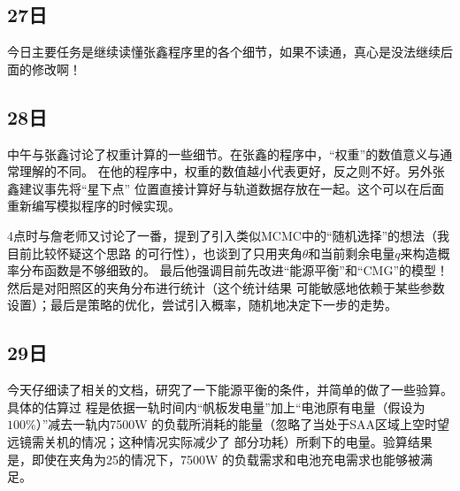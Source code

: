 
\subsection{27日}
今日主要任务是继续读懂张鑫程序里的各个细节，如果不读通，真心是没法继续后面的修改啊！

\subsection{28日}
中午与张鑫讨论了权重计算的一些细节。在张鑫的程序中，“权重”的数值意义与通常理解的不同。
在他的程序中，权重的数值越小代表更好，反之则不好。{\heiti 另外张鑫建议事先将“星下点”
位置直接计算好与轨道数据存放在一起。这个可以在后面重新编写模拟程序的时候实现。}

4点时与詹老师又讨论了一番，提到了引入类似MCMC中的“随机选择”的想法（我目前比较怀疑这个思路
的可行性），也谈到了只用夹角$\theta$和当前剩余电量$q$来构造概率分布函数是不够细致的。
最后他强调目前先改进“能源平衡”和“CMG”的模型！然后是对阳照区的夹角分布进行统计（这个统计结果
可能敏感地依赖于某些参数设置）；最后是策略的优化，尝试引入概率，随机地决定下一步的走势。

\subsection{29日}
今天仔细读了相关的文档，研究了一下能源平衡的条件，并简单的做了一些验算。具体的估算过
程是依据一轨时间内“帆板发电量”加上“电池原有电量（假设为$100\%$）”减去一轨内7500W
的负载所消耗的能量（忽略了当处于SAA区域上空时望远镜需关机的情况；这种情况实际减少了
部分功耗）所剩下的电量。验算结果是，即使在夹角为{25\textdegree}的情况下，7500W
的负载需求和电池充电需求也能够被满足。



